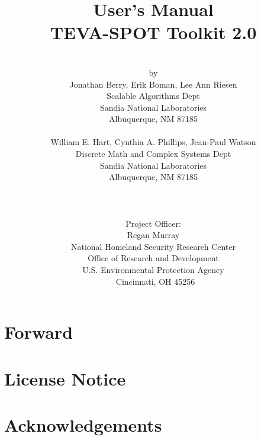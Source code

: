\documentclass[pdf,report]{EPAmanual}
\title{\sc User's Manual\\TEVA-SPOT Toolkit 2.0}
\author{\\by\\
Jonathan Berry, Erik Boman, Lee Ann Riesen\\
Scalable Algorithms Dept\\
Sandia National Laboratories\\
Albuquerque, NM 87185\\
\mbox{}\\
William E. Hart, Cynthia A. Phillips, Jean-Paul Watson\\
Discrete Math and Complex Systems Dept\\
Sandia National Laboratories\\
Albuquerque, NM 87185\\
    \\\\\\
    Project Officer:\\
    \sc Regan Murray\\
    \sc National Homeland Security Research Center\\
    \sc Office of Research and Development\\
    \sc U.S. Environmental Protection Agency\\\
    \sc Cincinnati, OH 45256
  }
\date{}
\begin{document}
  \maketitle

  \clearpage
  
  
  \clearpage
  \chapter*{Forward}
  

  \clearpage
  \chapter*{License Notice}
  

  \clearpage
  \chapter*{Acknowledgements}
  

  \cleardoublepage
  \tableofcontents

  \SANDmain



\newpage




\newpage

\appendix





  
\end{document}
